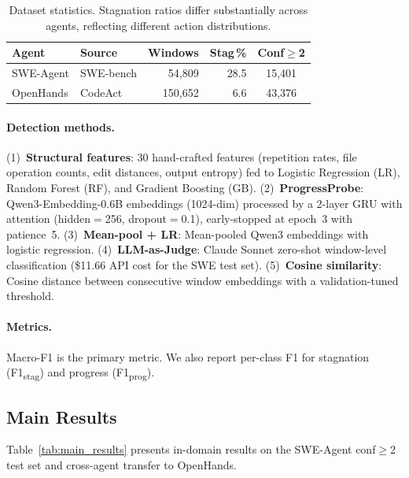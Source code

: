 \begin{table}[t]
\centering
\small
\begin{tabular}{llrrc}
\toprule
\textbf{Agent} & \textbf{Source} & \textbf{Windows} & \textbf{Stag\,\%} & \textbf{Conf${\geq}$2} \\
\midrule
SWE-Agent & SWE-bench & 54,809 & 28.5 & 15,401 \\
OpenHands & CodeAct   & 150,652 & 6.6 & 43,376 \\
\bottomrule
\end{tabular}
\caption{Dataset statistics. Stagnation ratios differ substantially across agents, reflecting different action distributions.}
\label{tab:dataset_stats}
\end{table}

\paragraph{Detection methods.}
(1)~\textbf{Structural features}: 30 hand-crafted features (repetition rates, file operation counts, edit distances, output entropy) fed to Logistic Regression (LR), Random Forest (RF), and Gradient Boosting (GB).
(2)~\textbf{ProgressProbe}: Qwen3-Embedding-0.6B \citep{zhang2025qwen3embedding} embeddings (1024-dim) processed by a 2-layer GRU \citep{cho2014gru} with attention \citep{bahdanau2015attention} (hidden$=$256, dropout$=$0.1), early-stopped at epoch~3 with patience~5.
(3)~\textbf{Mean-pool + LR}: Mean-pooled Qwen3 embeddings with logistic regression.
(4)~\textbf{LLM-as-Judge}: Claude Sonnet zero-shot window-level classification (\$11.66 API cost for the SWE test set).
(5)~\textbf{Cosine similarity}: Cosine distance between consecutive window embeddings with a validation-tuned threshold.

\paragraph{Metrics.}
Macro-F1 is the primary metric. We also report per-class F1 for stagnation (F1\textsubscript{stag}) and progress (F1\textsubscript{prog}).

\subsection{Main Results}
\label{sec:main_results}

Table~\ref{tab:main_results} presents in-domain results on the SWE-Agent conf${\geq}$2 test set and cross-agent transfer to OpenHands.

